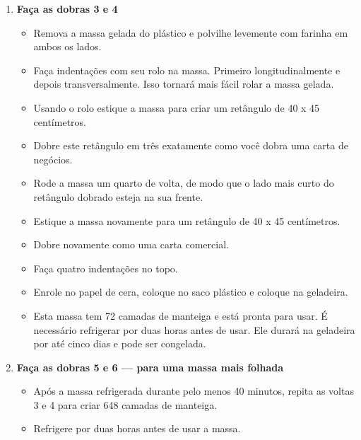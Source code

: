 \documentclass [11pt, letterpaper] {article}
\newcommand \fileName {PuffPastry}
\begin{document}
\begin {description}
\begin {enumerate}
\item {\bf Faça as dobras 3 e 4}
\begin {itemize}
\item Remova a massa gelada do pl\'astico e polvilhe levemente com farinha em ambos os lados.
\item Faça indentações com seu rolo na massa. Primeiro longitudinalmente e depois transversalmente. Isso tornará mais fácil rolar a massa gelada.
\item Usando o rolo estique a massa para criar um retângulo de 40 x 45 cent\'imetros.
\item Dobre este retângulo em três exatamente como você dobra uma carta de negócios.
\item Rode a massa um quarto de volta, de modo que o lado mais curto do retângulo dobrado esteja na sua frente.
\item Estique a massa novamente para um retângulo de 40 x 45 cent\'imetros.
\item Dobre novamente como uma carta comercial.
\item Faça quatro indentações no topo.
\item Enrole no papel de cera, coloque no saco plástico e coloque na geladeira.
\item Esta massa tem 72 camadas de manteiga e está pronta para usar. É necessário refrigerar por duas horas antes de usar. Ele durará na geladeira por até cinco dias e pode ser congelada.
\end {itemize}
\item {\bf Faça as dobras 5 e 6 --- para uma massa mais folhada}
\begin {itemize}
\item Após a massa refrigerada durante pelo menos 40 minutos, repita as voltas 3 e 4 para criar 648 camadas de manteiga.
\item Refrigere por duas horas antes de usar a massa.
\end {itemize}
\end {enumerate}
\end {description}


\end{document}
